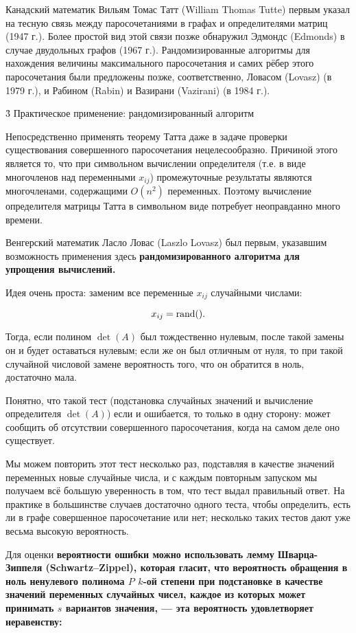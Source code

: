Канадский математик Вильям Томас Татт (William Thomas Tutte) первым указал на тесную связь между паросочетаниями в графах и определителями матриц (1947 г.). Более простой вид этой связи позже обнаружил Эдмондс (Edmonds) в случае двудольных графов (1967 г.). Рандомизированные алгоритмы для нахождения величины максимального паросочетания и самих рёбер этого паросочетания были предложены позже, соответственно, Ловасом (Lovasz) (в 1979 г.), и Рабином (Rabin) и Вазирани (Vazirani) (в 1984 г.).


\h3{ Практическое применение: рандомизированный алгоритм }

Непосредственно применять теорему Татта даже в задаче проверки существования совершенного паросочетания нецелесообразно. Причиной этого является то, что при символьном вычислении определителя (т.е. в виде многочленов над переменными $x_{ij}$) промежуточные результаты являются многочленами, содержащими $O(n^2)$ переменных. Поэтому вычисление определителя матрицы Татта в символьном виде потребует неоправданно много времени.

Венгерский математик Ласло Ловас (Laszlo Lovasz) был первым, указавшим возможность применения здесь \bf{рандомизированного} алгоритма для упрощения вычислений.

Идея очень проста: заменим все переменные $x_{ij}$ случайными числами:

$$ x_{ij} = {\rm rand}(). $$

Тогда, если полином $\det(A)$ был тождественно нулевым, после такой замены он и будет оставаться нулевым; если же он был отличным от нуля, то при такой случайной числовой замене вероятность того, что он обратится в ноль, достаточно мала.

Понятно, что такой тест (подстановка случайных значений и вычисление определителя $\det(A)$) если и ошибается, то только в одну сторону: может сообщить об отсутствии совершенного паросочетания, когда на самом деле оно существует.

Мы можем повторить этот тест несколько раз, подставляя в качестве значений переменных новые случайные числа, и с каждым повторным запуском мы получаем всё большую уверенность в том, что тест выдал правильный ответ. На практике в большинстве случаев достаточно одного теста, чтобы определить, есть ли в графе совершенное паросочетание или нет; несколько таких тестов дают уже весьма высокую вероятность.

Для оценки \bf{вероятности ошибки} можно использовать лемму Шварца-Зиппеля (Schwartz–Zippel), которая гласит, что вероятность обращения в ноль ненулевого полинома $P$ $k$-ой степени при подстановке в качестве значений переменных случайных чисел, каждое из которых может принимать $s$ вариантов значения, --- эта вероятность удовлетворяет неравенству:

